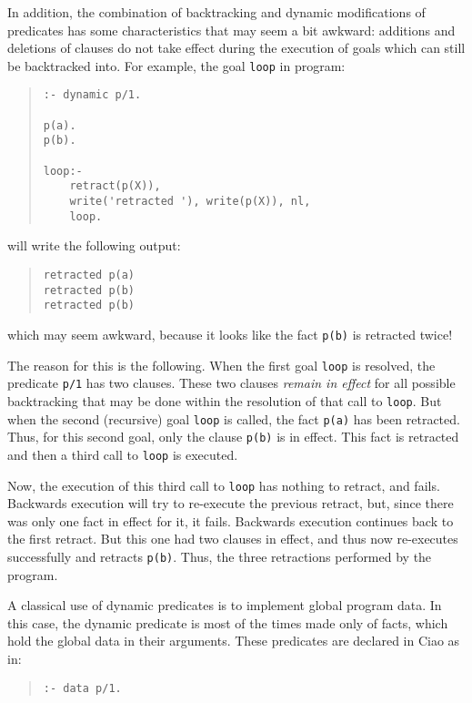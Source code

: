 In addition, the combination of backtracking and dynamic modifications
of predicates has some characteristics that may seem a bit awkward:
additions and deletions of clauses do not take effect during the
execution of goals which can still be backtracked into. For example,
the goal \verb+loop+ in program: 
\begin{quote}
\begin{verbatim}
:- dynamic p/1.

p(a).
p(b).

loop:-
    retract(p(X)),
    write('retracted '), write(p(X)), nl,
    loop.
\end{verbatim}
\end{quote}
%
will write the following output:
\begin{quote}
\begin{verbatim}
retracted p(a)
retracted p(b)
retracted p(b)
\end{verbatim}
\end{quote}
%
which may seem awkward, because it looks like the fact \verb+p(b)+ is
retracted twice!

The reason for this is the following. When the first goal \verb+loop+
is resolved, the predicate \verb+p/1+ has two clauses. These two
clauses {\em remain in effect} for all possible backtracking that may be
done within the resolution of that call to \verb+loop+. But when the
second (recursive) goal \verb+loop+ is called, the fact \verb+p(a)+
has been retracted. Thus, for this second goal, only the clause
\verb+p(b)+ is in effect. This fact is retracted and then a third call
to \verb+loop+ is executed.

Now, the execution of this third call to \verb+loop+ has nothing to
retract, and fails. Backwards execution will try to re-execute the
previous retract, but, since there was only one fact in effect for it,
it fails. Backwards execution continues back to the first retract. But
this one had two clauses in effect, and thus now re-executes
successfully and retracts \verb+p(b)+. Thus, the three retractions
performed by the program.

A classical use of dynamic predicates is to implement global program
data. In this case, the dynamic predicate is most of the times made
only of facts, which hold the global data in their arguments. These
predicates are declared in Ciao as in:
\begin{quote}
\begin{verbatim}
:- data p/1.
\end{verbatim}
\end{quote}

